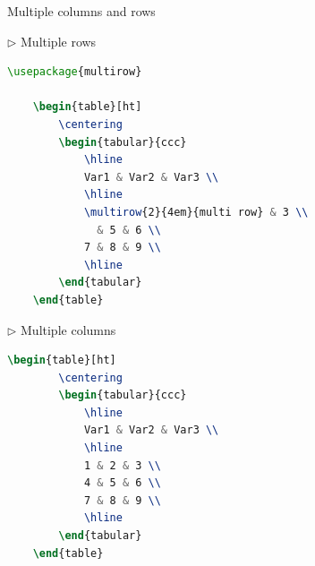 \documentclass{beamer}
\begin{document}
\begin{frame}[containsverbatim]{Multiple columns and rows}
	\begin{multicols}{2}
	\noindent  
	$\triangleright$ Multiple rows
	\begin{lstlisting}[language=TeX, basicstyle=\tiny]
	\usepackage{multirow}
	
	\begin{table}[ht]
		\centering
		\begin{tabular}{ccc}
			\hline  
			Var1 & Var2 & Var3 \\ 
			\hline
			\multirow{2}{4em}{multi row} & 3 \\
			  & 5 & 6 \\
			7 & 8 & 9 \\
			\hline
		\end{tabular}
	\end{table}   \end{lstlisting}
	
	\columnbreak
	
	$\triangleright$ Multiple columns
	\begin{lstlisting}[language=TeX, basicstyle=\tiny]
	\begin{table}[ht]
		\centering
		\begin{tabular}{ccc}
			\hline 
			Var1 & Var2 & Var3 \\ 
			\hline
			1 & 2 & 3 \\
			4 & 5 & 6 \\
			7 & 8 & 9 \\
			\hline
		\end{tabular}
	\end{table}   \end{lstlisting}
	\end{multicols}
\end{frame}
\end{document}
